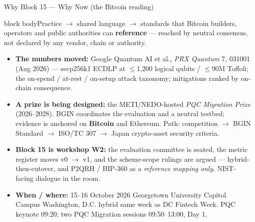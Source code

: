 \documentclass[aspectratio=169,10pt]{beamer}
\newcommand{\lead}[1]{\begin{beamercolorbox}[wd=\textwidth,sep=2.5mm,rounded=false]{block body}\small #1\end{beamercolorbox}\vspace{2mm}}
\begin{document}
\begin{frame}{Why Block 15 --- Why Now (the Bitcoin reading)}
  \lead{Practice $\rightarrow$ shared language $\rightarrow$ standards that Bitcoin builders, operators and public authorities can \textbf{reference} --- reached by neutral consensus, not declared by any vendor, chain or authority.}
  \begin{itemize}\small
    \item \textbf{The numbers moved:} Google Quantum AI et al., \emph{PRX Quantum} 7, 031001 (Aug 2026) --- secp256k1 ECDLP at $\leq$1{,}200 logical qubits / $\leq$90M Toffoli; the on-spend / at-rest / on-setup attack taxonomy; mitigations ranked by on-chain consequence.
    \item \textbf{A prize is being designed:} the METI/NEDO-hosted \emph{PQC Migration Prize} (2026--2028). BGIN coordinates the evaluation and a neutral testbed; evidence is anchored on \textbf{Bitcoin} and Ethereum. Path: competition $\rightarrow$ BGIN Standard $\rightarrow$ ISO/TC 307 $\rightarrow$ Japan crypto-asset security criteria.
    \item \textbf{Block 15 is workshop W2:} the evaluation committee is seated, the metric register moves v0 $\rightarrow$ v1, and the scheme-scope rulings are argued --- hybrid-then-cutover, and P2QRH / BIP-360 as a \emph{reference mapping only}. NIST-facing dialogue in the room.
    \item \textbf{When / where:} 15--16 October 2026 \textperiodcentered{} Georgetown University Capitol Campus \textperiodcentered{} Washington, D.C. \textperiodcentered{} hybrid \textperiodcentered{} same week as DC Fintech Week. PQC keynote 09:20; two PQC Migration sessions 09:50--13:00, Day 1.
  \end{itemize}
\end{frame}
\end{document}
